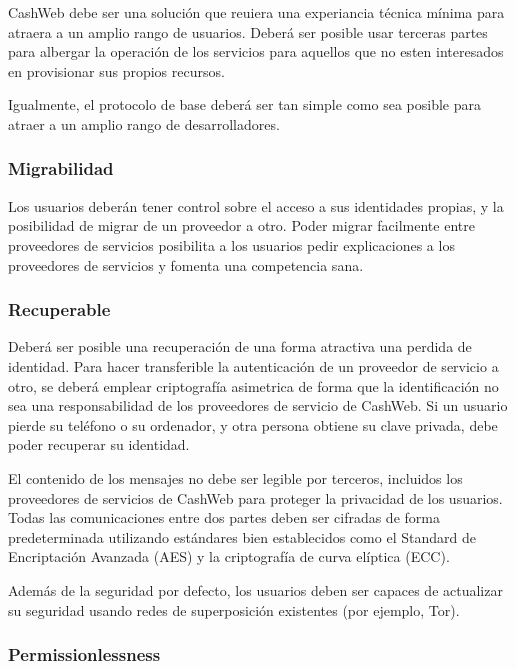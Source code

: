 \documentclass{article}
\begin{document}
CashWeb debe ser una solución que reuiera una experiancia técnica mínima para atraera a un amplio rango de usuarios. Deberá ser posible usar terceras partes para albergar la operación de los servicios para aquellos que no esten interesados en provisionar sus propios recursos.

Igualmente, el protocolo de base deberá ser tan simple como sea posible para atraer a un amplio rango de desarrolladores.

\subsubsection{Migrabilidad}

Los usuarios deberán tener control sobre el acceso a sus identidades propias, y la posibilidad de migrar de un proveedor a otro. Poder migrar facilmente entre proveedores de servicios posibilita a los usuarios pedir explicaciones a los proveedores de servicios y fomenta una competencia sana.

\subsubsection{Recuperable}

Deberá ser posible una recuperación de una forma atractiva una perdida de identidad. Para hacer transferible la autenticación de un proveedor de servicio a otro, se deberá emplear criptografía asimetrica de forma que la identificación no sea una responsabilidad de los proveedores de servicio de CashWeb. Si un usuario pierde su teléfono o su ordenador, y otra persona obtiene su clave privada, debe poder recuperar su identidad.


El contenido de los mensajes no debe ser legible por terceros, incluidos los proveedores de servicios de CashWeb para proteger la privacidad de los usuarios. Todas las comunicaciones entre dos partes deben ser cifradas de forma predeterminada utilizando estándares bien establecidos como el Standard de Encriptación Avanzada (AES) y la criptografía de curva elíptica (ECC).

Además de la seguridad por defecto, los usuarios deben ser capaces de actualizar su seguridad usando redes de superposición existentes (por ejemplo, Tor).

\subsubsection{Permissionlessness}
\end{document}
